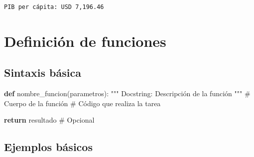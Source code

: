 \documentclass[
  doc,
  floatsintext,
  longtable,
  a4paper,
  nolmodern,
  notxfonts,
  notimes,
  12pt,
  colorlinks=true,linkcolor=blue,citecolor=blue,urlcolor=blue]{apa7}
\newenvironment{Shaded}{\begin{snugshade}}{\end{snugshade}}
\newcommand{\CommentTok}[1]{\textcolor[rgb]{0.37,0.37,0.37}{#1}}
\newcommand{\ControlFlowTok}[1]{\textcolor[rgb]{0.00,0.23,0.31}{\textbf{#1}}}
\newcommand{\KeywordTok}[1]{\textcolor[rgb]{0.00,0.23,0.31}{\textbf{#1}}}
\newcommand{\NormalTok}[1]{\textcolor[rgb]{0.00,0.23,0.31}{#1}}
\begin{document}
\begin{verbatim}
PIB per cápita: USD 7,196.46
\end{verbatim}

\section{Definición de funciones}\label{definiciuxf3n-de-funciones}

\subsection{Sintaxis básica}\label{sintaxis-buxe1sica}

\begin{Shaded}
\begin{Highlighting}[]
\KeywordTok{def}\NormalTok{ nombre\_funcion(parametros):}
    \CommentTok{"""}
\CommentTok{    Docstring: Descripción de la función}
\CommentTok{    """}
    \CommentTok{\# Cuerpo de la función}
    \CommentTok{\# Código que realiza la tarea}
    
    \ControlFlowTok{return}\NormalTok{ resultado  }\CommentTok{\# Opcional}
\end{Highlighting}
\end{Shaded}

\subsection{Ejemplos básicos}\label{ejemplos-buxe1sicos}
\end{document}
